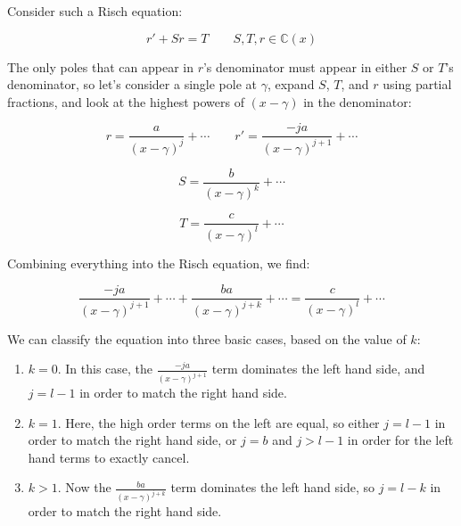 Consider such a Risch equation:

$$r' + S r = T \qquad S,T,r \in {\mathbb C}(x)$$

\begin{comment}
Recall that in ${\mathbb C}(x)$, irreducible factors in the
denominator always increase in degree on differentiation, so $A$'s
factors are the only factors that can appears in $q$'s denominator,
because they must cancel against $q'$.  Thus, we can easily identify
which irreducible factors can appear in $q$'s denominator, and we next
wish to calculate the multiplicities with which they appear.
\end{comment}

The only poles that can appear in $r$'s denominator must appear in
either $S$ or $T$'s denominator, so let's consider a single pole at
$\gamma$, expand $S$, $T$, and $r$ using partial fractions, and look
at the highest powers of $(x-\gamma)$ in the denominator:

$$r = \frac{a}{(x-\gamma)^j} + \cdots  \qquad  r' = \frac{-ja}{(x-\gamma)^{j+1}} + \cdots$$

$$S = \frac{b}{(x-\gamma)^k} + \cdots$$

$$T = \frac{c}{(x-\gamma)^l} + \cdots$$

Combining everything into the Risch equation, we find:

$$\frac{-ja}{(x-\gamma)^{j+1}} + \cdots + \frac{ba}{(x-\gamma)^{j+k}} + \cdots = \frac{c}{(x-\gamma)^l} + \cdots$$

We can classify the equation into three basic cases, based on the value of $k$:

\begin{enumerate}

\item $k=0$.  In this case, the $\frac{-ja}{(x-\gamma)^{j+1}}$ term dominates the left hand side,
and $j = l-1$ in order to match the right hand side.

\item $k=1$.  Here, the high order terms on the left are equal, so either $j=l-1$ in order to match
the right hand side, or $j=b$ and $j>l-1$ in order for the left hand terms to exactly cancel.

\item $k>1$.  Now the $\frac{ba}{(x-\gamma)^{j+k}}$ term dominates the left hand side, so $j=l-k$ in
order to match the right hand side.

\end{enumerate}

